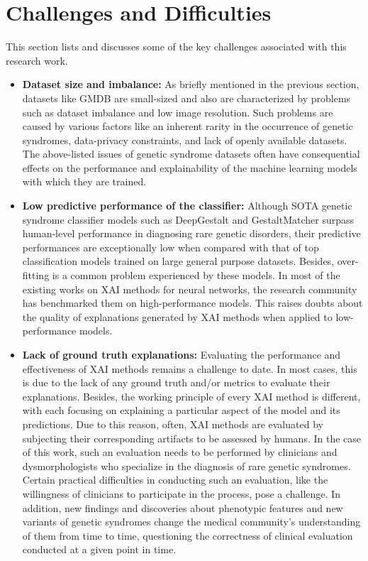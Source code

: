 \documentclass[../report.tex]{subfiles}
\begin{document}
    \section{Challenges and Difficulties} \label{sec_challenges}
    This section lists and discusses some of the key challenges associated with this research work.
	\begin{itemize}
		\item \textbf{Dataset size and imbalance: }As briefly mentioned in the previous section, datasets like GMDB are small-sized and also are characterized by problems such as dataset imbalance and low image resolution. Such problems are caused by various factors like an inherent rarity in the occurrence of genetic syndromes, data-privacy constraints, and lack of openly available datasets. The above-listed issues of genetic syndrome datasets often have consequential effects on the performance and explainability of the machine learning models with which they are trained. 

		\item \textbf{Low predictive performance of the classifier: }Although SOTA genetic syndrome classifier models such as DeepGestalt and GestaltMatcher surpass human-level performance in diagnosing rare genetic disorders, their predictive performances are exceptionally low when compared with that of top classification models trained on large general purpose datasets. Besides, over-fitting is a common problem experienced by these models. In most of the existing works on XAI methods for neural networks, the research community has benchmarked them on high-performance models. This raises doubts about the quality of explanations generated by XAI methods when applied to low-performance models.
	
		\item \textbf{Lack of ground truth explanations: }Evaluating the performance and effectiveness of XAI methods remains a challenge to date. In most cases, this is due to the lack of any ground truth and/or metrics to evaluate their explanations. Besides, the working principle of every XAI method is different, with each focusing on explaining a particular aspect of the model and its predictions. Due to this reason, often, XAI methods are evaluated by subjecting their corresponding artifacts to be assessed by humans. In the case of this work, such an evaluation needs to be performed by clinicians and dysmorphologists who specialize in the diagnosis of rare genetic syndromes. Certain practical difficulties in conducting such an evaluation, like the willingness of clinicians to participate in the process, pose a challenge. In addition, new findings and discoveries about phenotypic features and new variants of genetic syndromes change the medical community's understanding of them from time to time, questioning the correctness of clinical evaluation conducted at a given point in time.
\end{itemize}
   
\end{document}
